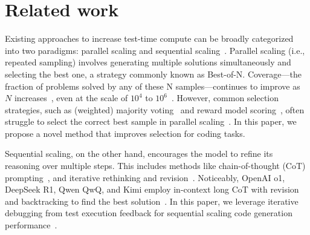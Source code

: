 \section{Related work}
Existing approaches to increase test-time compute can be broadly categorized into two paradigms: parallel scaling and sequential scaling~\citep{muennighoff2025s1}. 
Parallel scaling (i.e., repeated sampling) involves generating multiple solutions simultaneously and selecting the best one, a strategy commonly known as Best-of-N.
Coverage---the fraction of problems solved by any of these N samples---continues to improve as $N$ increases~\citep{chollet2019measure, irvine2023rewarding}, even at the scale of $10^4$ to $10^6$~\citep{brown2024large, li2022competition}. 
However, common selection strategies, such as (weighted) majority voting~\citep{wang2022self} and reward model scoring~\citep{christiano2017deep, lightman2023let, wang2024math, wu2024inference, beeching2024dvts, pan2024swegym}, often struggle to select the correct best sample in parallel scaling~\citep{brown2024large, hassid2024larger, stroebl2024inference}. In this paper, we propose a novel method that improves selection for coding tasks. 

Sequential scaling, on the other hand, encourages the model to refine its reasoning over multiple steps. This includes methods like chain-of-thought (CoT) prompting~\citep{wei2022chain, nye2021show}, and iterative rethinking and revision~\citep{madaan2024self, lee2025evolving, hou2025advancing, huang2022large, min2024imitate, sky_t1_2025, muennighoff2025s1, wang2024theoretical, li2025llms}. Noticeably, OpenAI o1, DeepSeek R1, Qwen QwQ, and Kimi employ in-context long CoT with revision and backtracking to find the best solution~\citep{openai_learning_to_reason_2024, guo2025deepseek, qwen_qwq_2024, team2025kimi}. In this paper, we leverage iterative debugging from test execution feedback for sequential scaling code generation performance~\citep{chen2023teaching}.



